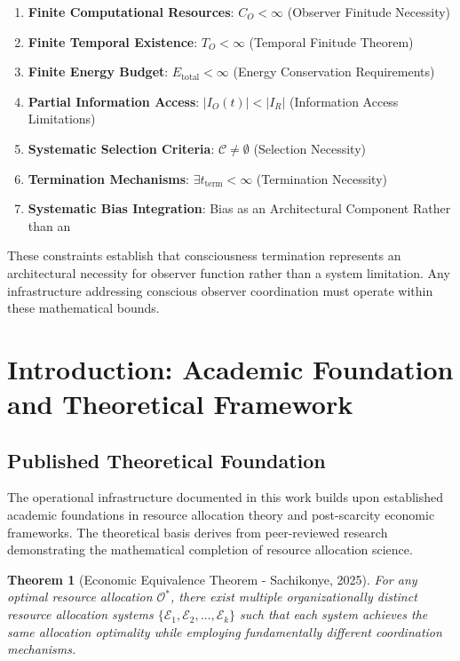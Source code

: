 \documentclass[12pt,a4paper]{article}
\newtheorem{theorem}{Theorem}[section]
\begin{document}
\begin{enumerate}
\item \textbf{Finite Computational Resources}: $C_O < \infty$ (Observer Finitude Necessity)
\item \textbf{Finite Temporal Existence}: $T_O < \infty$ (Temporal Finitude Theorem)
\item \textbf{Finite Energy Budget}: $E_{\text{total}} < \infty$ (Energy Conservation Requirements)
\item \textbf{Partial Information Access}: $|I_O(t)| < |I_R|$ (Information Access Limitations)
\item \textbf{Systematic Selection Criteria}: $\mathcal{C} \neq \emptyset$ (Selection Necessity)
\item \textbf{Termination Mechanisms}: $\exists t_{\text{term}} < \infty$ (Termination Necessity)
\item \textbf{Systematic Bias Integration}: Bias as an Architectural Component Rather than an
\end{enumerate}

These constraints establish that consciousness termination represents an architectural necessity for observer function rather than a system limitation. Any infrastructure addressing conscious observer coordination must operate within these mathematical bounds.
\section{Introduction: Academic Foundation and Theoretical Framework}

\subsection{Published Theoretical Foundation}

The operational infrastructure documented in this work builds upon established academic foundations in resource allocation theory and post-scarcity economic frameworks. The theoretical basis derives from peer-reviewed research demonstrating the mathematical completion of resource allocation science.

\begin{theorem}[Economic Equivalence Theorem - Sachikonye, 2025]
For any optimal resource allocation $\mathcal{O}^*$, there exist multiple organizationally distinct resource allocation systems $\{\mathcal{E}_1, \mathcal{E}_2, \ldots, \mathcal{E}_k\}$ such that each system achieves the same allocation optimality while employing fundamentally different coordination mechanisms.
\end{theorem}
\end{document}
